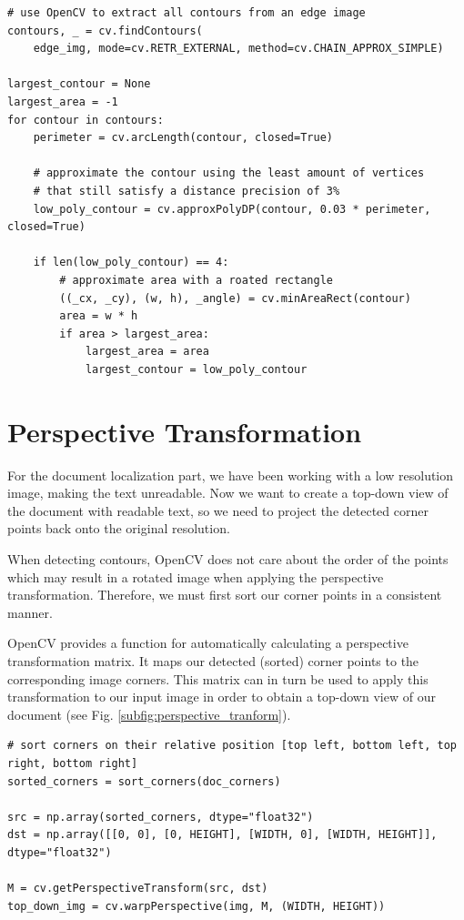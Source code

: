 \documentclass[bibliography=totoc]{scrartcl}
\begin{document}
\lstset{language=Python}
\lstset{frame=lines}
\lstset{basicstyle=\footnotesize}
\begin{lstlisting}
# use OpenCV to extract all contours from an edge image
contours, _ = cv.findContours(
	edge_img, mode=cv.RETR_EXTERNAL, method=cv.CHAIN_APPROX_SIMPLE)

largest_contour = None
largest_area = -1
for contour in contours:
	perimeter = cv.arcLength(contour, closed=True)
	
	# approximate the contour using the least amount of vertices 
	# that still satisfy a distance precision of 3%
	low_poly_contour = cv.approxPolyDP(contour, 0.03 * perimeter, closed=True)

	if len(low_poly_contour) == 4:
		# approximate area with a roated rectangle
		((_cx, _cy), (w, h), _angle) = cv.minAreaRect(contour)
		area = w * h
		if area > largest_area:
			largest_area = area
			largest_contour = low_poly_contour
	\end{lstlisting}


\section{Perspective Transformation}
For the document localization part, we have been working with a low resolution image, making the text unreadable.
Now we want to create a top-down view of the document with readable text, so we need to project the detected corner points back onto the original resolution.

When detecting contours, OpenCV does not care about the order of the points which may result in a rotated image when applying the perspective transformation.
Therefore, we must first sort our corner points in a consistent manner.

OpenCV provides a function for automatically calculating a perspective transformation matrix.
It maps our detected (sorted) corner points to the corresponding image corners.
This matrix can in turn be used to apply this transformation to our input image in order to obtain a top-down view of our document (see Fig. \ref{subfig:perspective_tranform}).\\

\lstset{language=Python}
\lstset{frame=lines}
\lstset{basicstyle=\footnotesize}
\begin{lstlisting}
# sort corners on their relative position [top left, bottom left, top right, bottom right]
sorted_corners = sort_corners(doc_corners)

src = np.array(sorted_corners, dtype="float32")
dst = np.array([[0, 0], [0, HEIGHT], [WIDTH, 0], [WIDTH, HEIGHT]], dtype="float32")

M = cv.getPerspectiveTransform(src, dst)
top_down_img = cv.warpPerspective(img, M, (WIDTH, HEIGHT))
	\end{lstlisting}
\end{document}
